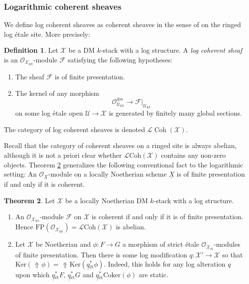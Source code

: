 \documentclass[11pt]{amsart}
\theoremstyle{definition}
\theoremstyle{definition}
\newtheorem{theorem}{Theorem}[subsection]
\newtheorem{definition}[theorem]{Definition}
\DeclareMathOperator{\arrowup}{\!\Uparrow \!}
\newcommand{\cL}{\mathcal{L}}
\newcommand{\cO}{\mathcal{O}}
\newcommand{\cU}{\mathcal{U}}
\newcommand{\cX}{\mathcal{X}}
\newcommand{\LogO}[1]{\mathcal{O}_{{#1}_\text{l\'et}}}
\newcommand{\ul}[1]{\underline{#1}}
\newcommand{\cal}{\mathcal}
\def\cL{{\cal L}}
\def\cO{{\cal O}}
\def\cU{{\cal U}}
\def\cX{{\cal X}}
\newcommand{\logcoh}[1]{\cL \text{Coh}(#1)}
\begin{document}
\subsubsection{Logarithmic coherent sheaves} 
We define log coherent sheaves as coherent sheaves in the sense of \cite[03DL]{stacks} on the ringed log \'etale site. More precisely:
\begin{definition}
Let $\mathcal{X}$ be a DM $k$-stack with a log structure. A \emph{log coherent sheaf} is an $\mathcal{O}_{\mathcal{X}_{\text{l\'et}}}$-module $\mathcal{F}$ satisfying the following hypotheses:
\begin{enumerate}
\item The sheaf $\mathcal{F}$ is of finite presentation.
\item The kernel of any morphism $$\mathcal{O}_{\cU_{\text{l\'et}}}^{\oplus n}\longrightarrow \mathcal{F}|_{\cU_{\text{l\'et}}}$$ on some log \'etale open $\cU\rightarrow \mathcal{X}$ is generated by finitely many global sections. 
\end{enumerate}
The category of log coherent sheaves is denoted $\mathcal{L}\operatorname{Coh}(\mathcal{X})$.
\end{definition}
Recall that the category of coherent sheaves on a ringed site is always abelian, although it is not a priori clear whether $\logcoh{\mathcal{X}}$ contains any non-zero objects. 
Theorem \ref{thm: FPisCoherent} generalizes the following conventional fact to the logarithmic setting: An $\cO_{\ul{X}}$-module on a locally Noetherian scheme $\ul{X}$ is of finite presentation if and only if it is coherent.
\begin{theorem}\label{thm: FPisCoherent}
Let $\mathcal{X}$ be a locally Noetherian DM $k$-stack with a log structure.
\begin{enumerate}
    \item\label{item: fp is coherent} An $\mathcal{O}_{\mathcal{X}_{\text{l\'et}}}$-module $\mathcal{F}$ on $\mathcal{X}$ is coherent if and only if it is of finite presentation. Hence $\text{FP}(\LogO{\cX}) = \logcoh{\mathcal{X}}$ is abelian.
    \item\label{item: how to compute kernels} Let $\mathcal{X}$ be Noetherian and $\phi\colon F\rightarrow G$ a morphism of strict \'etale $\mathcal{O}_{\ul{\mathcal{X}}{}_{\text{\'et}}}$-modules of finite presentation. Then there is some log modification $q\colon \mathcal{X}'\rightarrow \mathcal{X}$ so that $\text{Ker}(\arrowup \phi) = \arrowup \text{Ker}(\ul{q}{}_{\text{\'et}}^*\phi)$. Indeed, this holds for any log alteration $q$ upon which $\ul{q}{}_{\text{\'et}}^*F$, $\ul{q}{}_{\text{\'et}}^*G$ and $\ul{q}{}_{\text{\'et}}^*\text{Coker}(\phi)$ are static.
\end{enumerate}
\end{theorem}
\end{document}

